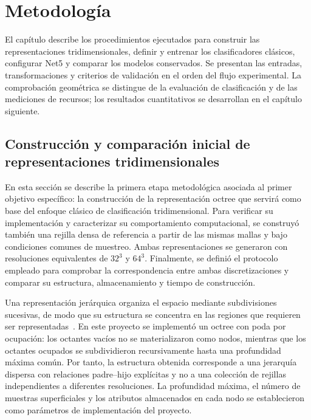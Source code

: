 \chapter{Metodología}
\label{chap:metodologia}

El capítulo describe los procedimientos ejecutados para construir las representaciones tridimensionales, definir y entrenar los clasificadores clásicos, configurar Net5 y comparar los modelos conservados. Se presentan las entradas, transformaciones y criterios de validación en el orden del flujo experimental. La comprobación geométrica se distingue de la evaluación de clasificación y de las mediciones de recursos; los resultados cuantitativos se desarrollan en el capítulo siguiente.

\section{Construcción y comparación inicial de representaciones tridimensionales}\label{sec:construccion-representaciones}

En esta sección se describe la primera etapa metodológica asociada al primer objetivo específico: la construcción de la representación octree que servirá como base del enfoque clásico de clasificación tridimensional. Para verificar su implementación y caracterizar su comportamiento computacional, se construyó también una rejilla densa de referencia a partir de las mismas mallas y bajo condiciones comunes de muestreo. Ambas representaciones se generaron con resoluciones equivalentes de $32^3$ y $64^3$. Finalmente, se definió el protocolo empleado para comprobar la correspondencia entre ambas discretizaciones y comparar su estructura, almacenamiento y tiempo de construcción.

Una representación jerárquica organiza el espacio mediante subdivisiones sucesivas, de modo que su estructura se concentra en las regiones que requieren ser representadas~\parencite{samet}. En este proyecto se implementó un octree con poda por ocupación: los octantes vacíos no se materializaron como nodos, mientras que los octantes ocupados se subdividieron recursivamente hasta una profundidad máxima común. Por tanto, la estructura obtenida corresponde a una jerarquía dispersa con relaciones padre--hijo explícitas y no a una colección de rejillas independientes a diferentes resoluciones. La profundidad máxima, el número de muestras superficiales y los atributos almacenados en cada nodo se establecieron como parámetros de implementación del proyecto.

